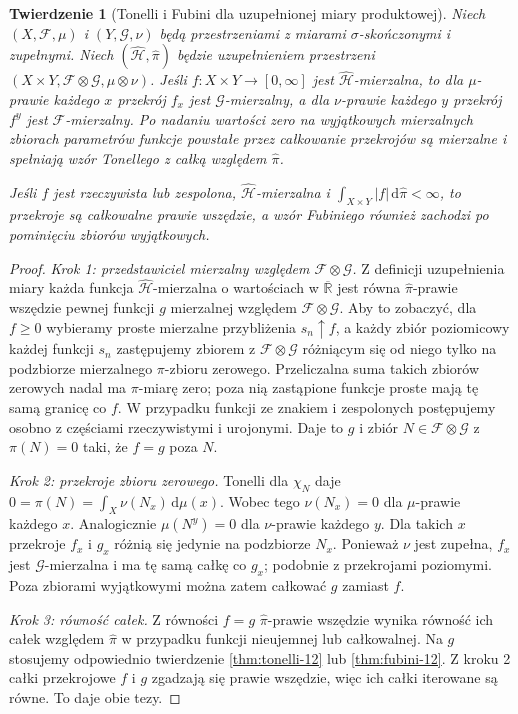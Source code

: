 \documentclass[11pt,a4paper,oneside]{book}
\numberwithin{equation}{chapter}
\theoremstyle{plain}
\newtheorem{twierdzenie}{Twierdzenie}[chapter]
\theoremstyle{definition}
\theoremstyle{remark}
\begin{document}
\begin{twierdzenie}[Tonelli i Fubini dla uzupełnionej miary produktowej]
\label{thm:completed-product-fubini-12}
Niech $(X,\mathcal F,\mu)$ i $(Y,\mathcal G,\nu)$
będą przestrzeniami z miarami $\sigma$-skończonymi
i \emph{zupełnymi}. Niech $(\widehat{\mathcal H},
\widehat\pi)$ będzie uzupełnieniem przestrzeni
$(X\times Y,\mathcal F\otimes\mathcal G,\mu\otimes\nu)$.
Jeśli $f:X\times Y\to[0,\infty]$ jest
$\widehat{\mathcal H}$-mierzalna, to dla $\mu$-prawie
każdego $x$ przekrój $f_x$ jest $\mathcal G$-mierzalny,
a dla $\nu$-prawie każdego $y$ przekrój $f^y$ jest
$\mathcal F$-mierzalny. Po nadaniu wartości zero
na wyjątkowych mierzalnych zbiorach parametrów
funkcje powstałe przez całkowanie przekrojów są
mierzalne i spełniają wzór Tonellego z całką
względem $\widehat\pi$.

Jeśli $f$ jest rzeczywista lub zespolona,
$\widehat{\mathcal H}$-mierzalna i
$\int_{X\times Y}|f|\,\mathrm d\widehat\pi<\infty$,
to przekroje są całkowalne prawie wszędzie,
a wzór Fubiniego również zachodzi po pominięciu
zbiorów wyjątkowych.
\end{twierdzenie}
\begin{proof}
\emph{Krok 1: przedstawiciel mierzalny względem
$\mathcal F\otimes\mathcal G$.}
Z definicji uzupełnienia miary każda funkcja
$\widehat{\mathcal H}$-mierzalna o wartościach
w $\overline{\mathbb R}$ jest równa
$\widehat\pi$-prawie wszędzie pewnej funkcji
$g$ mierzalnej względem $\mathcal F\otimes\mathcal G$.
Aby to zobaczyć, dla $f\ge0$ wybieramy proste
mierzalne przybliżenia $s_n\uparrow f$, a każdy
zbiór poziomicowy każdej funkcji $s_n$ zastępujemy
zbiorem z $\mathcal F\otimes\mathcal G$ różniącym
się od niego tylko na podzbiorze mierzalnego
$\pi$-zbioru zerowego. Przeliczalna suma takich
zbiorów zerowych nadal ma $\pi$-miarę zero;
poza nią zastąpione funkcje proste mają tę samą
granicę co $f$. W przypadku funkcji ze znakiem
i zespolonych postępujemy osobno z częściami
rzeczywistymi i urojonymi. Daje to $g$ i zbiór
$N\in\mathcal F\otimes\mathcal G$ z $\pi(N)=0$
taki, że $f=g$ poza $N$.

\emph{Krok 2: przekroje zbioru zerowego.}
Tonelli dla $\chi_N$ daje
$0=\pi(N)=\int_X\nu(N_x)\,\mathrm d\mu(x)$.
Wobec tego $\nu(N_x)=0$ dla $\mu$-prawie każdego
$x$. Analogicznie $\mu(N^y)=0$ dla $\nu$-prawie
każdego $y$. Dla takich $x$ przekroje $f_x$ i $g_x$
różnią się jedynie na podzbiorze $N_x$.
Ponieważ $\nu$ jest zupełna, $f_x$ jest
$\mathcal G$-mierzalna i ma tę samą całkę co $g_x$;
podobnie z przekrojami poziomymi. Poza zbiorami
wyjątkowymi można zatem całkować $g$ zamiast $f$.

\emph{Krok 3: równość całek.}
Z równości $f=g$ $\widehat\pi$-prawie wszędzie
wynika równość ich całek względem $\widehat\pi$
w przypadku funkcji nieujemnej lub całkowalnej.
Na $g$ stosujemy odpowiednio twierdzenie
\ref{thm:tonelli-12} lub \ref{thm:fubini-12}.
Z kroku 2 całki przekrojowe $f$ i $g$ zgadzają
się prawie wszędzie, więc ich całki iterowane
są równe. To daje obie tezy.
\end{proof}
\end{document}
